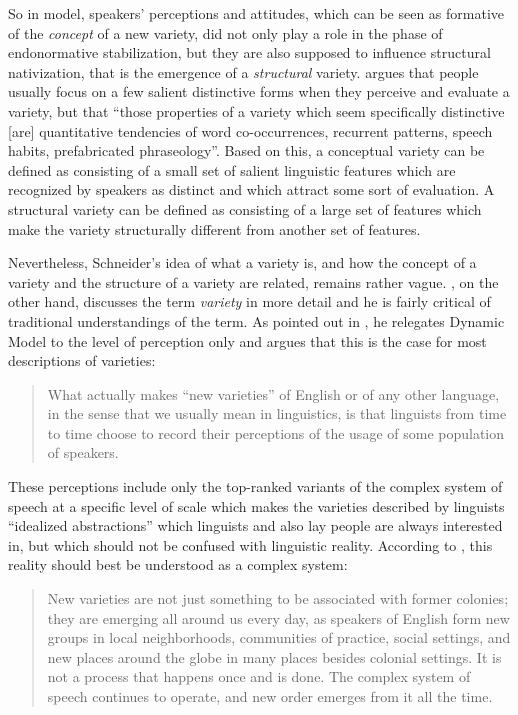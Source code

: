 So in  model, speakers’ perceptions and attitudes, which can be seen as formative of the \emph{concept} of a new variety, did not only play a role in the phase of endonormative stabilization, but they are also supposed to influence structural nativization, that is the emergence of a \emph{structural} variety. \citet[94]{Schneider2007} argues that people usually focus on a few salient distinctive forms when they perceive and evaluate a variety, but that “those properties of a variety which seem specifically distinctive [are] quantitative tendencies of word co-occurrences, recurrent patterns, speech habits, prefabricated phraseology”. Based on this, a conceptual variety can be defined as consisting of a small set of salient linguistic features which are recognized by speakers as distinct and which attract some sort of evaluation. A structural variety can be defined as consisting of a large set of features which make the variety structurally different from another set of features.


Nevertheless, Schneider’s idea of what a variety is, and how the concept of a variety and the structure of a variety are related, remains rather vague. \citet{Kretzschmar2014, Kretzschmar2015, Kretzschmar2015b}, on the other hand, discusses the term \textit{variety} in more detail and he is fairly critical of traditional understandings of the term. As pointed out in , he relegates  Dynamic Model to the level of perception only and argues that this is the case for most descriptions of varieties:

\begin{quote}
What actually makes “new varieties” of English or of any other language, in the sense that we usually mean in linguistics, is that linguists from time to time choose to record their perceptions of the usage of some population of speakers. \citep[157]{Kretzschmar2014}
\end{quote}

These perceptions include only the top-ranked variants of the complex system of speech at a specific level of scale which makes the varieties described by linguists “idealized abstractions” \citep[156]{Kretzschmar2014} which linguists and also lay people are always interested in, but which should not be confused with linguistic reality. According to \citet{Kretzschmar2014}, this reality should best be understood as a complex system:

\begin{quote}
New varieties are not just something to be associated with former colonies; they are emerging all around us every day, as speakers of English form new groups in local neighborhoods, communities of practice, social settings, and new places around the globe in many places besides colonial settings. It is not a process that happens once and is done. The complex system of speech continues to operate, and new order emerges from it all the time. \citep[157]{Kretzschmar2014}
\end{quote}


